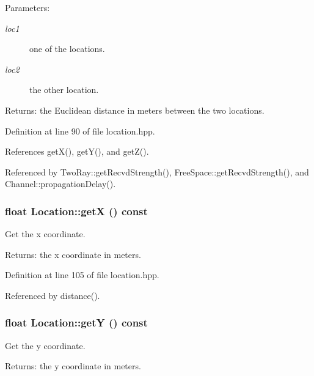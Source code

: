 \begin{Desc}
\item[Parameters:]
\begin{description}
\item[{\em loc1}]one of the locations. \item[{\em loc2}]the other location. \end{description}
\end{Desc}
\begin{Desc}
\item[Returns:]the Euclidean distance in meters between the two locations. \end{Desc}


Definition at line 90 of file location.hpp.

References get\-X(), get\-Y(), and get\-Z().

Referenced by Two\-Ray::get\-Recvd\-Strength(), Free\-Space::get\-Recvd\-Strength(), and Channel::propagation\-Delay().
\subsubsection{\setlength{\rightskip}{0pt plus 5cm}float Location::get\-X () const\hspace{0.3cm}{\tt  [inline]}}\label{classLocation_4c2db6e6aaea0d3bfde4d1a640aa38e8}


Get the x coordinate. 

\begin{Desc}
\item[Returns:]the x coordinate in meters. \end{Desc}


Definition at line 105 of file location.hpp.

Referenced by distance().
\subsubsection{\setlength{\rightskip}{0pt plus 5cm}float Location::get\-Y () const\hspace{0.3cm}{\tt  [inline]}}\label{classLocation_4db1347cb238d35ac0b597057d243cfe}


Get the y coordinate. 

\begin{Desc}
\item[Returns:]the y coordinate in meters. \end{Desc}


